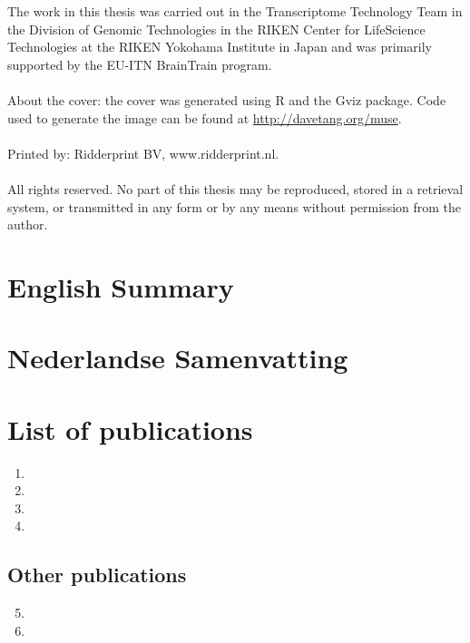 \documentclass[12pt,a4paper]{report}
\begin{document}
\newpage

\normalsize
{
   \setlength{\parindent}{0cm}
   The work in this thesis was carried out in the Transcriptome Technology Team in the Division of Genomic Technologies in the RIKEN Center for LifeScience Technologies at the RIKEN Yokohama Institute in Japan and was primarily supported by the EU-ITN BrainTrain program.
   \\
   \\
   About the cover: the cover was generated using R and the Gviz package. Code used to generate the image can be found at \href{http://davetang.org/muse/2015/02/06/thesis-cover-art/}{http://davetang.org/muse}.
   \\
   \\
   Printed by: Ridderprint BV, www.ridderprint.nl.
   \\
   \\
   All rights reserved. No part of this thesis may be reproduced, stored in a retrieval system, or transmitted in any form or by any means without permission from the author.
}

\chapter*{English Summary}
\small


\chapter*{Nederlandse Samenvatting}

\normalsize

\chapter*{List of publications}

\begin{enumerate}
   \item {}
   \item {}
   \item {}
   \item {}
\end{enumerate}

\section*{Other publications}

\begin{enumerate}
   \setcounter{enumi}{4}
   \item {}
   \item {}
\end{enumerate}
\end{document}
